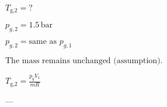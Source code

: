 \( T_{\text{g,2}} = ? \)  

\( p_{g,2} = 1.5 \, \text{bar} \)  

\( p_{g,2} = \text{same as } p_{g,1} \)  

\( \text{The mass remains unchanged (assumption).} \)  

\( T_{\text{g,2}} = \frac{p_{g} V_1}{m R} \)  

---